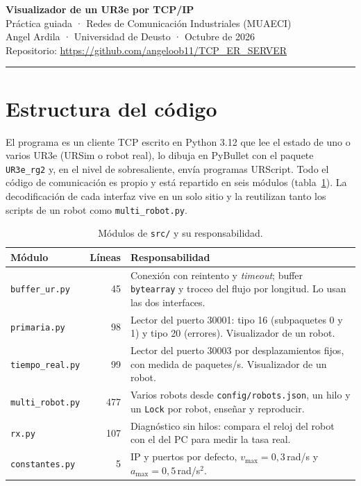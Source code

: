 \documentclass[10pt,a4paper]{article}
\newcommand{\code}[1]{\texttt{\small #1}}
\begin{document}
\begin{center}
{\LARGE\bfseries\color{azul} Visualizador de un UR3e por TCP/IP}\\[3pt]
{\large Práctica guiada · Redes de Comunicación Industriales (MUAECI)}\\[3pt]
{\normalsize Angel Ardila · Universidad de Deusto · Octubre de 2026}\\[2pt]
{\small Repositorio: \url{https://github.com/angeloob11/TCP_ER_SERVER}}
\end{center}
\vspace{-4pt}
\noindent\rule{\linewidth}{0.4pt}

\section{Estructura del código}

El programa es un cliente TCP escrito en Python 3.12 que lee el estado de uno o varios UR3e (URSim o robot real), lo dibuja en PyBullet con el paquete \code{UR3e\_rg2} y, en el nivel de sobresaliente, envía programas URScript. Todo el código de comunicación es propio y está repartido en seis módulos (tabla~\ref{tab:modulos}). La decodificación de cada interfaz vive en un solo sitio y la reutilizan tanto los scripts de un robot como \code{multi\_robot.py}.

\begin{table}[h]
\centering\small
\caption{Módulos de \code{src/} y su responsabilidad.}\label{tab:modulos}
\begin{tabularx}{\linewidth}{@{}l r X@{}}
\toprule
Módulo & Líneas & Responsabilidad \\ \midrule
\code{buffer\_ur.py} & 45 & Conexión con reintento y \emph{timeout}; buffer \code{bytearray} y troceo del flujo por longitud. Lo usan las dos interfaces. \\
\code{primaria.py} & 98 & Lector del puerto 30001: tipo 16 (subpaquetes 0 y 1) y tipo 20 (errores). Visualizador de un robot. \\
\code{tiempo\_real.py} & 99 & Lector del puerto 30003 por desplazamientos fijos, con medida de paquetes/s. Visualizador de un robot. \\
\code{multi\_robot.py} & 477 & Varios robots desde \code{config/robots.json}, un hilo y un \code{Lock} por robot, enseñar y reproducir. \\
\code{rx.py} & 107 & Diagnóstico sin hilos: compara el reloj del robot con el del PC para medir la tasa real. \\
\code{constantes.py} & 5 & IP y puertos por defecto, $v_{\max}=0{,}3$\,rad/s y $a_{\max}=0{,}5$\,rad/s$^2$. \\ \bottomrule
\end{tabularx}
\end{table}
\end{document}
